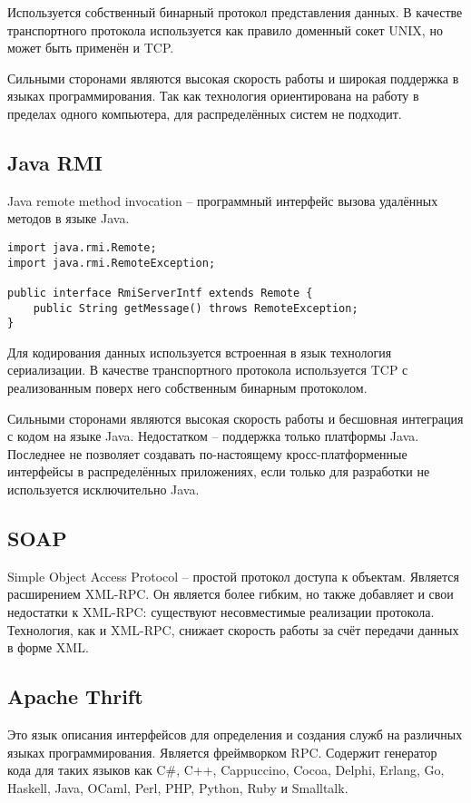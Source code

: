 Используется собственный бинарный протокол представления данных.
В качестве транспортного протокола используется как правило доменный сокет UNIX,
но может быть применён и TCP.

Сильными сторонами являются высокая скорость работы и широкая поддержка
в языках программирования. Так как технология ориентирована на работу
в пределах одного компьютера, для распределённых систем не подходит.

\subsection{Java RMI}
Java remote method invocation -- программный интерфейс вызова удалённых методов
в языке Java.
\begin{verbatim}
import java.rmi.Remote;
import java.rmi.RemoteException;

public interface RmiServerIntf extends Remote {
    public String getMessage() throws RemoteException;
}
\end{verbatim}

Для кодирования данных используется встроенная в язык технология сериализации.
В качестве транспортного протокола используется TCP с реализованным
поверх него собственным бинарным протоколом.

Сильными сторонами являются высокая скорость работы и бесшовная интеграция
с кодом на языке Java. Недостатком -- поддержка только платформы Java.
Последнее не позволяет создавать по-настоящему кросс-платформенные интерфейсы
в распределённых приложениях, если только для разработки не используется
исключительно Java.

\subsection{SOAP}
Simple Object Access Protocol -- простой протокол доступа к объектам.
Является расширением XML-RPC. Он является более гибким, но также добавляет
и свои недостатки к XML-RPC: существуют несовместимые реализации протокола.
Технология, как и XML-RPC, снижает скорость работы за счёт передачи данных
в форме XML.

\subsection{Apache Thrift}
Это язык описания интерфейсов для определения и создания служб
на различных языках программирования. Является фреймворком RPC.
Содержит генератор кода для таких языков как C\#, C++, Cappuccino, Cocoa,
Delphi, Erlang, Go, Haskell, Java, OCaml, Perl, PHP, Python, Ruby и Smalltalk.

